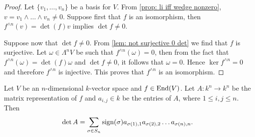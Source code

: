 \begin{proof}
    Let \(\{v_1, \dots, v_n\}\) be a basis for \(V\). From \cref{prop: li iff
        wedge nonzero}, \(v = v_1 \wedge \dots \wedge v_n \neq 0\).  Suppose first
    that \(f\) is an isomorphism, then \(f^{\wedge n}(v) = \det(f) v\) implies
    \(\det f \neq 0\).

    Suppose now that \(\det f \neq 0\). From \cref{lem: not surjective 0 det} we
    find that \(f\) is surjective. Let \(\omega \in \Lambda^n V\) be such that
    \(f^{\wedge n}(\omega) = 0\), then from the fact that \(f^{\wedge n}(\omega) =
    \det(f) \omega\) and \(\det f \neq 0\), it follows that \(\omega = 0\). Hence
    \(\ker f^{\wedge n} = 0\) and therefore \(f^{\wedge n}\) is injective. This
    proves that \(f^{\wedge n}\) is an isomorphism.
\end{proof}

\begin{proposition}
    \label{prop: matrix det}
    Let \(V\) be an \(n\)-dimensional \(k\)-vector space and \(f \in \operatorname{End}(V)\).
    Let \(A: k^n \to k^n\) be the matrix representation of \(f\) and \(a_{i, j}
    \in k\) be the entries of \(A\), where \(1 \leq i, j \leq n\). Then
    \[
        \det A = \sum_{\sigma \in S_n} \operatorname{sign}(\sigma) a_{\sigma(1), 1}
        a_{\sigma(2), 2} \dots a_{\sigma(n), n}.
    \]
\end{proposition}

